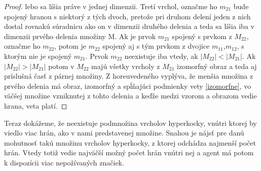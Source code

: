 \begin{proof}
lebo sa líšia práve v jednej dimenzii. Tretí vrchol, označme ho $m_{21}$
 bude spojený hranou s
niektorý z tých dvoch, pretože pri druhom delení jeden z nich dostal rovnakú
súradnicu ako on v dimenzii druhého delenia a teda sa líšia iba v dimenzii
prvého delenia množiny M. Ak je prvok $m_{21}$ spojený s prvkom z
$M_{22}$, označme ho $m_{22}$, potom je $m_{22}$ spojený aj s tým prvkom
z dvojice $m_{11}$,$m_{12}$, s ktorým nie je spojený $m_{21}$.
Prvok $m_{22}$ neexistuje iba vtedy, ak $|M_{22}|<|M_{21}|$. 
Ak $|M_{22}|>|M_{21}|$ potom v $M_{22}$ majú všetky vrcholy z $M_{21}$
izomorfný obraz a teda aj príslušná časť z párnej množiny.
Z horeuvedeného vyplýva, že menšia množina z prvého delenia má obraz,
izomorfný a spĺňajúci podmienky vety \ref{izomorfne}, 
vo väčšej množine vzniknutej z tohto delenia a keďže 
medzi vzorom a obrazom vedie hrana, veta platí.
\end{proof}

Teraz dokážeme, že neexistuje podmnožina vrcholov hyperkocky, vnútri ktorej
by viedlo viac hrán, ako v nami predstavenej množine. Snahou je nájsť pre
danú mohutnosť takú množinu vrcholov hyperkocky, z ktorej odchádza najmenší
počet hrán. Vtedy totiž vedie najväčší možný počet hrán vnútri nej a agent
má potom k dispozícii viac nepožívaných značiek.

